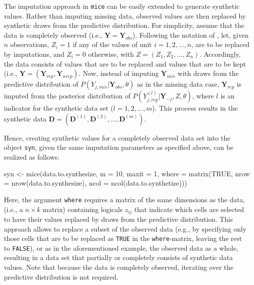\documentclass[psych,article,submit,moreauthors,pdftex]{mdpi}
\newenvironment{Shaded}{\begin{snugshade}}{\end{snugshade}}
\newcommand{\AttributeTok}[1]{\textcolor[rgb]{0.77,0.63,0.00}{#1}}
\newcommand{\ConstantTok}[1]{\textcolor[rgb]{0.00,0.00,0.00}{#1}}
\newcommand{\DecValTok}[1]{\textcolor[rgb]{0.00,0.00,0.81}{#1}}
\newcommand{\FunctionTok}[1]{\textcolor[rgb]{0.00,0.00,0.00}{#1}}
\newcommand{\NormalTok}[1]{#1}
\newcommand{\OtherTok}[1]{\textcolor[rgb]{0.56,0.35,0.01}{#1}}
\begin{document}
The imputation approach in \texttt{mice} can be easily extended to
generate synthetic values. Rather than imputing missing data, observed
values are then replaced by synthetic draws from the predictive
distribution. For simplicity, assume that the data is completely
observed (i.e., \(\textbf{Y} = \textbf{Y}_{obs}\)). Following the
notation of \citet{reiter_raghunathan_multiple_2007}, let, given \(n\)
observations, \(Z_i = 1\) if any of the values of unit
\(i = 1, 2, \dots, n\), are to be replaced by imputations, and
\(Z_i = 0\) otherwise, with \(Z = (Z_1, Z_2, \dots, Z_n)\). Accordingly,
the data consists of values that are to be replaced and values that are
to be kept (i.e.,
\(\textbf{Y} = (\textbf{Y}_{rep}, \textbf{Y}_{nrep})\). Now, instead of
imputing \(\textbf{Y}_{mis}\) with draws from the predictive
distribution of \(P(Y_{j, mis} | \textbf{Y}_{obs}, \theta)\) as in the
missing data case, \(\textbf{Y}_{rep}\) is imputed from the posterior
distribution of \(P(Y^{(l)}_{j, rep} | \textbf{Y}_{-j}, Z, \theta)\),
where \(l\) is an indicator for the synthetic data set
(\(l = 1, 2, \dots, m\)). This process results in the synthetic data
\(\textbf{D} = (\textbf{D}^{(1)}, \textbf{D}^{(2)}, \dots, \textbf{D}^{(m)})\).

Hence, creating synthetic values for a completely observed data set into
the object \texttt{syn}, given the same imputation parameters as
specified above, can be realized as follows:

\begin{Shaded}
\begin{Highlighting}[]
\NormalTok{syn }\OtherTok{\textless{}{-}} \FunctionTok{mice}\NormalTok{(data.to.synthesize, }
            \AttributeTok{m =} \DecValTok{10}\NormalTok{,}
            \AttributeTok{maxit =} \DecValTok{1}\NormalTok{,}
            \AttributeTok{where =} \FunctionTok{matrix}\NormalTok{(}\ConstantTok{TRUE}\NormalTok{,}
                           \AttributeTok{nrow =} \FunctionTok{nrow}\NormalTok{(data.to.synthesize),}
                           \AttributeTok{ncol =} \FunctionTok{ncol}\NormalTok{(data.to.synthetize)))}
\end{Highlighting}
\end{Shaded}

Here, the argument \texttt{where} requires a matrix of the same
dimensions as the data, (i.e., a \(n \times k\) matrix) containing
logicals \(z_{ij}\) that indicate which cells are selected to have their
values replaced by draws from the predictive distribution. This approach
allows to replace a subset of the observed data (e.g., by specifying
only those cells that are to be replaced as \texttt{TRUE} in the
\texttt{where}-matrix, leaving the rest to \texttt{FALSE}), or as in the
aforementioned example, the observed data as a whole, resulting in a
data set that partially or completely consists of synthetic data values.
Note that because the data is completely observed, iterating over the
predictive distribution is not required.
\end{document}
